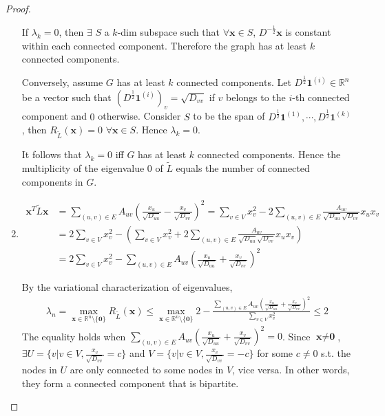 \documentclass[a4paper]{article}
\theoremstyle{definition}
\begin{document}
\begin{proof}
\begin{enumerate}
    If $\lambda_k=0$, then $\exists$ $S$ a $k$-dim subspace such that $\forall \textbf{x}\in S$, $D^{-\frac{1}{2}}\textbf{x}$ is constant within each connected component. Therefore the graph has at least $k$ connected components. 
    
    Conversely, assume $G$ has at least $k$ connected components. Let $D^{\frac{1}{2}}\textbf{1}^{(i)}\in\mathbb{R}^{n}$ be a vector such that $(D^{\frac{1}{2}}\textbf{1}^{(i)})_v=\sqrt{D_{vv}}$ if $v$ belongs to the $i$-th connected component and $0$ otherwise. Consider $S$ to be the span of $D^{\frac{1}{2}}\textbf{1}^{(1)},\cdots, D^{\frac{1}{2}}\textbf{1}^{(k)}$, then $R_{\tilde{L}}(\textbf{x})=0$ $\forall \textbf{x}\in S$. Hence $\lambda_k=0$.
    
    It follows that $\lambda_k=0$ iff $G$ has at least $k$ connected components. Hence the multiplicity of the eigenvalue $0$ of $\tilde{L}$ equals the number of connected components in $G$.
    
    \item \begin{align}\textbf{x}^{T}\tilde{L}\textbf{x} &= \sum_{(u, v)\in E}A_{uv}\left(\frac{x_u}{\sqrt{D_{uu}}}-\frac{x_v}{\sqrt{D_{vv}}}\right)^2 = \sum_{v\in V}x_v^2-2\sum_{(u, v)\in E}\frac{A_{uv}}{\sqrt{D_{uu}}\sqrt{D_{vv}}}x_u x_v\\
    &=2\sum_{v\in V}x_v^2-\left(\sum_{v\in V}x_v^2+2\sum_{(u, v)\in E}\frac{A_{uv}}{\sqrt{D_{uu}}\sqrt{D_{vv}}}x_u x_v\right)\\
    &= 2\sum_{v\in V}x_v^2-\sum_{(u, v)\in E}A_{uv}\left(\frac{x_u}{\sqrt{D_{uu}}}+\frac{x_v}{\sqrt{D_{vv}}}\right)^2\end{align}
    
    By the variational characterization of eigenvalues, 
    \begin{align}
    \lambda_n = \max_{\textbf{x}\in\mathbb{R}^{n}\setminus\{\textbf{0}\}}R_{\tilde{L}}(\textbf{x}) \leq \max_{\textbf{x}\in\mathbb{R}^{n}\setminus\{\textbf{0}\}} 2 - \frac{\sum_{(u, v)\in E}A_{uv}\left(\frac{x_u}{\sqrt{D_{uu}}}+\frac{x_v}{\sqrt{D_{vv}}}\right)^2}{\sum_{v\in V}x_v^2}\leq 2
    \end{align} The equality holds when $\sum_{(u, v)\in E}A_{uv}\left(\frac{x_u}{\sqrt{D_{uu}}}+\frac{x_v}{\sqrt{D_{vv}}}\right)^2=0$. Since $\textbf{x}\neq\textbf{0}$, $\exists U=\{v|v\in V, \frac{x_v}{\sqrt{D_{vv}}}=c\}$ and $V=\{v|v\in V, \frac{x_v}{\sqrt{D_{vv}}}=-c\}$ for some $c\neq 0$ s.t. the nodes in $U$ are only connected to some nodes in $V$, vice versa. In other words, they form a connected component that is bipartite.
\end{enumerate}
\end{proof}



\end{document}
